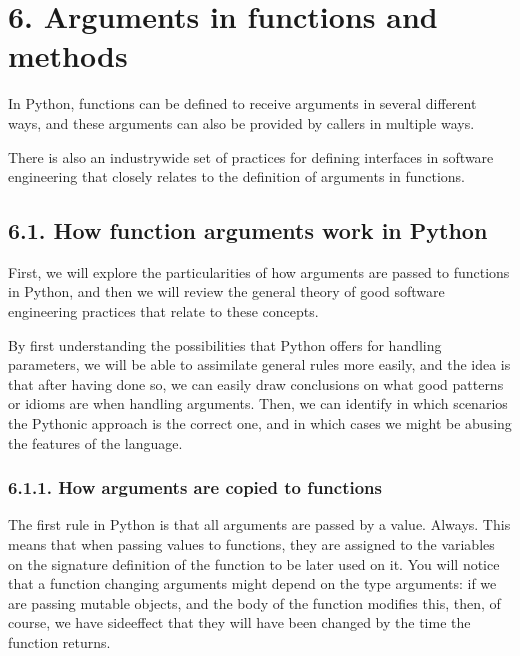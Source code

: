 \documentclass[a4paper,10pt,english]{sphinxmanual}
\begin{document}
\section{6. Arguments in functions and methods}
\label{\detokenize{chapters/3_general_traits/index:arguments-in-functions-and-methods}}
In Python, functions can be defined to receive arguments in several different ways, and these arguments can
also be provided by callers in multiple ways.

There is also an industry\sphinxhyphen{}wide set of practices for defining interfaces in software engineering that closely
relates to the definition of arguments in functions.


\subsection{6.1. How function arguments work in Python}
\label{\detokenize{chapters/3_general_traits/index:how-function-arguments-work-in-python}}
First, we will explore the particularities of how arguments are passed to functions in Python, and then we
will review the general theory of good software engineering practices that relate to these concepts.

By first understanding the possibilities that Python offers for handling parameters, we will be able to
assimilate general rules more easily, and the idea is that after having done so, we can easily draw
conclusions on what good patterns or idioms are when handling arguments. Then, we can identify in which
scenarios the Pythonic approach is the correct one, and in which cases we might be abusing the features of the
language.


\subsubsection{6.1.1. How arguments are copied to functions}
\label{\detokenize{chapters/3_general_traits/index:how-arguments-are-copied-to-functions}}
The first rule in Python is that all arguments are passed by a value. Always. This means that when passing
values to functions, they are assigned to the variables on the signature definition of the function to be
later used on it. You will notice that a function changing arguments might depend on the type arguments: if we
are passing mutable objects, and the body of the function modifies this, then, of course, we have side\sphinxhyphen{}effect
that they will have been changed by the time the function returns.
\end{document}
